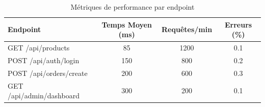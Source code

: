 \documentclass[12pt,a4paper]{report}
\begin{document}
\begin{appendices}
\begin{table}[H]
\centering
\begin{tabular}{|l|c|c|c|}
\hline
\textbf{Endpoint} & \textbf{Temps Moyen (ms)} & \textbf{Requêtes/min} & \textbf{Erreurs (\%)} \\
\hline
GET /api/products & 85 & 1200 & 0.1 \\
POST /api/auth/login & 150 & 800 & 0.2 \\
POST /api/orders/create & 200 & 600 & 0.3 \\
GET /api/admin/dashboard & 300 & 200 & 0.1 \\
\hline
\end{tabular}
\caption{Métriques de performance par endpoint}
\end{table}

\end{appendices}
\end{document}
